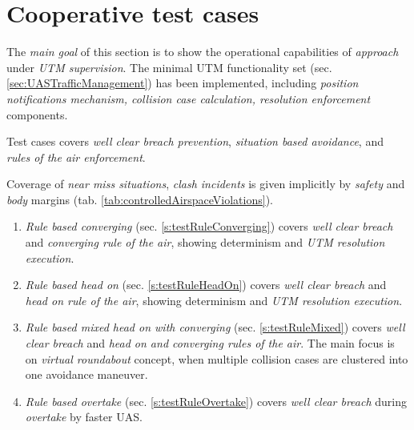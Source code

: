 \section{Cooperative test cases}\label{s:cooperativeTestCases}
    
    \noindent The \emph{main goal} of this section is to show the operational capabilities of \emph{approach} under \emph{UTM supervision}. The minimal UTM functionality set (sec. \ref{sec:UASTrafficManagement}) has been implemented, including \emph{position notifications mechanism, collision case calculation, resolution enforcement} components. 
    
    Test cases covers \emph{well clear breach prevention}, \emph{situation based avoidance}, and \emph{rules of the air enforcement}. 
    
    Coverage of \emph{near miss situations}, \emph{clash incidents} is given implicitly by \emph{safety} and \emph{body} margins (tab. \ref{tab:controlledAirspaceViolations}).
    
    \begin{enumerate}
        \item \emph{Rule based converging} (sec. \ref{s:testRuleConverging}) covers \emph{well clear breach} and \emph{converging rule of the air}, showing determinism and \emph{UTM resolution execution}.
        
        \item \emph{Rule based head on} (sec. \ref{s:testRuleHeadOn}) covers \emph{well clear breach} and \emph{head on rule of the air}, showing determinism and \emph{UTM resolution execution}.
        
        \item \emph{Rule based mixed head on with converging} (sec. \ref{s:testRuleMixed}) covers \emph{well clear breach} and \emph{head on and converging rules of the air}. The main focus is on \emph{virtual roundabout} concept, when multiple collision cases are clustered into one avoidance maneuver. 
        
        \item \emph{Rule based overtake} (sec. \ref{s:testRuleOvertake}) covers \emph{well clear breach} during \emph{overtake} by faster UAS.
    \end{enumerate}

